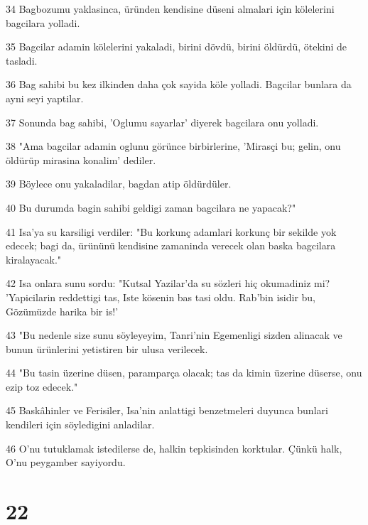 \par 34 Bagbozumu yaklasinca, üründen kendisine düseni almalari için kölelerini bagcilara yolladi.
\par 35 Bagcilar adamin kölelerini yakaladi, birini dövdü, birini öldürdü, ötekini de tasladi.
\par 36 Bag sahibi bu kez ilkinden daha çok sayida köle yolladi. Bagcilar bunlara da ayni seyi yaptilar.
\par 37 Sonunda bag sahibi, 'Oglumu sayarlar' diyerek bagcilara onu yolladi.
\par 38 "Ama bagcilar adamin oglunu görünce birbirlerine, 'Mirasçi bu; gelin, onu öldürüp mirasina konalim' dediler.
\par 39 Böylece onu yakaladilar, bagdan atip öldürdüler.
\par 40 Bu durumda bagin sahibi geldigi zaman bagcilara ne yapacak?"
\par 41 Isa'ya su karsiligi verdiler: "Bu korkunç adamlari korkunç bir sekilde yok edecek; bagi da, ürününü kendisine zamaninda verecek olan baska bagcilara kiralayacak."
\par 42 Isa onlara sunu sordu: "Kutsal Yazilar'da su sözleri hiç okumadiniz mi? 'Yapicilarin reddettigi tas, Iste kösenin bas tasi oldu. Rab'bin isidir bu, Gözümüzde harika bir is!'
\par 43 "Bu nedenle size sunu söyleyeyim, Tanri'nin Egemenligi sizden alinacak ve bunun ürünlerini yetistiren bir ulusa verilecek.
\par 44 "Bu tasin üzerine düsen, paramparça olacak; tas da kimin üzerine düserse, onu ezip toz edecek."
\par 45 Baskâhinler ve Ferisiler, Isa'nin anlattigi benzetmeleri duyunca bunlari kendileri için söyledigini anladilar.
\par 46 O'nu tutuklamak istedilerse de, halkin tepkisinden korktular. Çünkü halk, O'nu peygamber sayiyordu.

\chapter{22}

